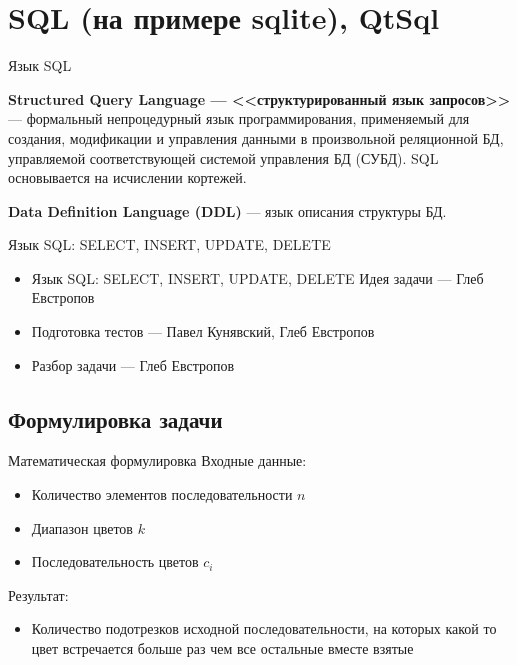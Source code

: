 \section{SQL (на примере sqlite), QtSql}

\begin{frame}[t]{Язык SQL}

\textbf{Structured Query Language --- <<структурированный язык запросов>>} --- 
формальный непроцедурный язык программирования,
применяемый для создания, модификации и управления данными в произвольной реляционной БД,
управляемой соответствующей системой управления БД (СУБД). SQL основывается на исчислении кортежей.

\textbf{Data Definition Language (DDL)} --- язык описания структуры БД.

\end{frame}


\begin{frame}[t]{Язык SQL: SELECT, INSERT, UPDATE, DELETE}
  \begin{itemize}
    \item Язык SQL: SELECT, INSERT, UPDATE, DELETE
Идея задачи --- Глеб Евстропов
    \item Подготовка тестов --- Павел Кунявский, Глеб Евстропов
    \item Разбор задачи --- Глеб Евстропов
  \end{itemize}
\end{frame}

\subsection{Формулировка задачи}

\begin{frame}[t]{Математическая формулировка}
  Входные данные:
  \begin{itemize}
    \item Количество элементов последовательности $n$
    \item Диапазон цветов $k$
    \item Последовательность цветов $c_i$
  \end{itemize}
  Результат:
  \begin{itemize}
    \item Количество подотрезков исходной последовательности, на которых какой то цвет встречается больше раз чем все остальные вместе взятые
  \end{itemize}
\end{frame}

